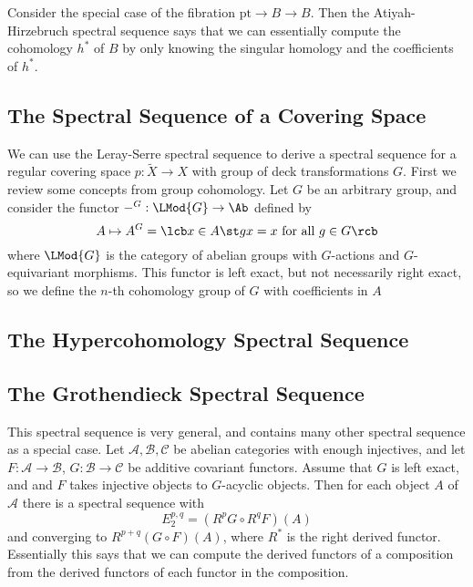 Consider the special case of the fibration $\text{pt} \rightarrow B \rightarrow B$. Then the Atiyah-Hirzebruch spectral sequence says that we can essentially compute the cohomology $h^*$ of $B$ by only knowing the singular homology and the coefficients of $h^*$.



\subsection{The Spectral Sequence of a Covering Space}

We can use the Leray-Serre spectral sequence to derive a spectral sequence for a regular covering space $p : \tilde{X} \rightarrow X$ with group of deck transformations $G$. First we review some concepts from group cohomology. Let $G$ be an arbitrary group, and consider the functor $-^G : \LMod{G} \rightarrow \Ab$ defined by
\[ A \mapsto A^G = \lcb x \in A \st gx = x \text{ for all } g \in G \rcb \]
where $\LMod{G}$ is the category of abelian groups with $G$-actions and $G$-equivariant morphisms. This functor is left exact, but not necessarily right exact, so we define the $n$-th cohomology group of $G$ with coefficients in $A$

\unfinished



\subsection{The Hypercohomology Spectral Sequence}


\subsection{The Grothendieck Spectral Sequence}

This spectral sequence is very general, and contains many other spectral sequence as a special case. Let $\mathscr A, \mathscr B, \mathscr C$ be abelian categories with enough injectives, and let $F : \mathscr A \rightarrow \mathscr B$, $G : \mathscr B \rightarrow \mathscr C$ be additive covariant functors. Assume that $G$ is left exact, and and $F$ takes injective objects to $G$-acyclic objects. Then for each object $A$ of $\mathscr A$ there is a spectral sequence with
\[ E_2^{p,q} = (R^p G \circ R^q F)(A) \]
and converging to $R^{p+q} (G \circ F)(A)$, where $R^*$ is the right derived functor. Essentially this says that we can compute the derived functors of a composition from the derived functors of each functor in the composition. 



